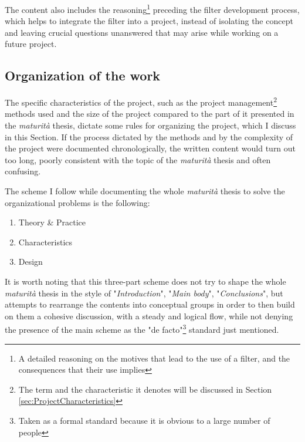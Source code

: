 \documentclass[a4paper, 10pt, final]{article} %
\begin{document}
    The content also includes the reasoning\footnote{A detailed reasoning on the motives that lead to the use of a filter, and the consequences that their use implies} preceding the filter development process, which helps to integrate the filter into a project, instead of isolating the concept and leaving crucial questions unanswered that may arise while working on a future project.
    
    \subsection{Organization of the work}\label{sec:IntroOrganization}
    The specific characteristics of the project, such as the project management\footnote{The term and the characteristic it denotes will be discussed in Section \ref{sec:ProjectCharacteristics}} methods used and the size of the project compared to the part of it presented in the \emph{maturit\`{a}} thesis, dictate some rules for organizing the project, which I discuss in this Section.
    If the process dictated by the methods and by the complexity of the project were documented chronologically, the written content would turn out too long, poorly consistent with the topic of the \emph{maturit\`{a}} thesis and often confusing.
    
    \begin{samepage}
        \noindent The scheme I follow while documenting the whole \emph{maturit\`{a}} thesis to solve the organizational problems is the following:
        \begin{enumerate}[label=\emph{(\roman*)}]
            \item Theory \& Practice
            \item Characteristics
            \item Design
        \end{enumerate}
    \end{samepage}
    It is worth noting that this three-part scheme does not try to shape the whole \emph{maturit\`{a}} thesis in the style of "\emph{Introduction}", "\emph{Main body}", "\emph{Conclusions}", but attempts to rearrange the contents into conceptual groups in order to then build on them a cohesive discussion, with a steady and logical flow, while not denying the presence of the main scheme as the "de facto"\footnote{Taken as a formal standard because it is obvious to a large number of people} standard just mentioned.
    
\end{document}
